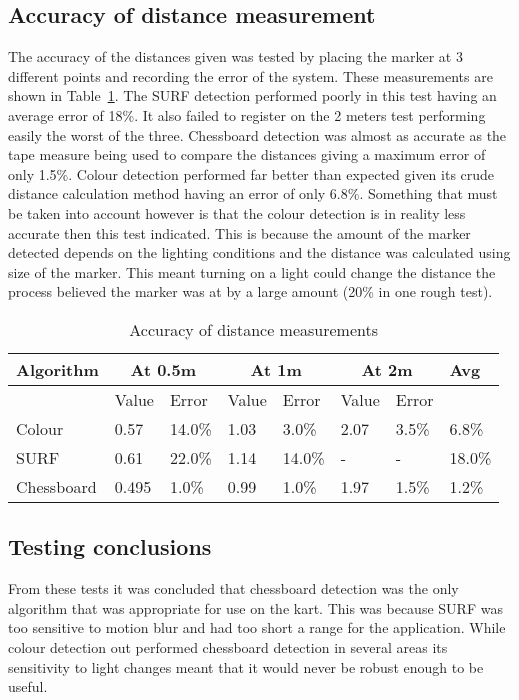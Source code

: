 \subsection{Accuracy of distance measurement}
The accuracy of the distances given was tested by placing the marker at 3 different points and recording the error of the system. These measurements are shown in Table~\ref{acc}. The SURF detection performed poorly in this test having an average error of 18\%. It also failed to register on the 2 meters test performing easily the worst of the three. Chessboard detection was almost as accurate as the tape measure being used to compare the distances giving a maximum error of only 1.5\%. Colour detection performed far better than expected given its crude distance calculation method having an error of only 6.8\%. Something that must be taken into account however is that the colour detection is in reality less accurate then this test indicated. This is because the amount of the marker detected depends on the lighting conditions and the distance was calculated using size of the marker. This meant turning on a light could change the distance the process believed the marker was at by a large amount (20\% in one rough test).

\begin{table}
	\caption{Accuracy of distance measurements}
	\begin{center}
    	\begin{tabular}{ | p{1.1cm} | p{0.5cm} | p{0.6cm} | p{0.5cm} | p{0.6cm} | p{0.5cm} | p{0.6cm} | l |}
    	\hline
    	Algorithm & \multicolumn{2}{|c|}{At 0.5m} & \multicolumn{2}{|c|}{At 1m} & \multicolumn{2}{|c|}{At 2m} & Avg \\ \hline
    	& Value & Error & Value & Error & Value & Error & \\ \hline
		Colour & 0.57 & 14.0\% & 1.03 & 3.0\% & 2.07 & 3.5\% & 6.8\% \\ \hline
		SURF & 0.61 & 22.0\% & 1.14 & 14.0\% & - & - & 18.0\% \\ \hline
		Chessboard & 0.495 & 1.0\% & 0.99 & 1.0\% & 1.97 & 1.5\% & 1.2\% \\ \hline
    	\end{tabular}
	\end{center}
	
	\label{acc}
	
\end{table}

\subsection{Testing conclusions}
From these tests it was concluded that chessboard detection was the only algorithm that was appropriate for use on the kart. This was because SURF was too sensitive to motion blur and had too short a range for the application. While colour detection out performed chessboard detection in several areas its sensitivity to light changes meant that it would never be robust enough to be useful.